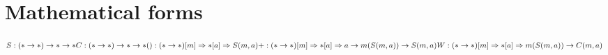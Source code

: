 \appendix 

\section{Mathematical forms}

\begin{math}
	S : (\ast \to \ast) \to \ast \to \ast \\
	C : (\ast \to \ast) \to \ast \to \ast \\
	() : (\ast \to \ast) [m] \Rightarrow \ast [a] \Rightarrow S(m, a) \\
	+ : (\ast \to \ast) [m] \Rightarrow \ast [a] \Rightarrow a \to m(S(m,a)) \to S(m,a) \\
	W : (\ast \to \ast) [m] \Rightarrow \ast [a] \Rightarrow m(S(m,a)) \to C(m,a)
\end{math}